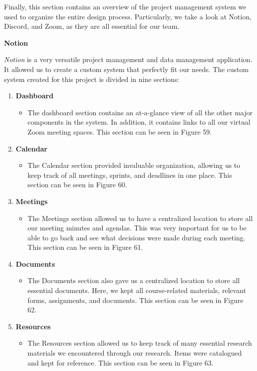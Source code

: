 \documentclass[titlepage, 12pt]{article}
\begin{document}
Finally, this section contains an overview of the project management system we used to organize the entire design process. Particularly, we take a look at Notion, Discord, and Zoom, as they are all essential for our team.

\textbf{Notion}

\emph{Notion} is a very versatile project management and data management application. It allowed us to create a custom system that perfectly fit our needs. The custom system created for this project is divided in nine sections:

\begin{enumerate}
    \item \textbf{Dashboard}
    \begin{itemize}
        \item The dashboard section contains an at-a-glance view of all the other major components in the system. In addition, it contains links to all our virtual Zoom meeting spaces. This section can be seen in Figure 59.
    \end{itemize}
    \item \textbf{Calendar}
    \begin{itemize}
        \item The Calendar section provided invaluable organization, allowing us to keep track of all meetings, sprints, and deadlines in one place. This section can be seen in Figure 60. 
    \end{itemize}
    \item \textbf{Meetings}
    \begin{itemize}
        \item The Meetings section allowed us to have a centralized location to store all our meeting minutes and agendas. This was very important for us to be able to go back and see what decisions were made during each meeting. This section can be seen in Figure 61. 
    \end{itemize}
    \item \textbf{Documents}
    \begin{itemize}
        \item The Documents section also gave us a centralized location to store all essential documents. Here, we kept all course-related materials, relevant forms, assignments, and documents. This section can be seen in Figure 62.
    \end{itemize}
    \item \textbf{Resources}
    \begin{itemize}
        \item The Resources section allowed us to keep track of many essential research materials we encountered through our research. Items were catalogued and kept for reference. This section can be seen in Figure 63.

\end{itemize}
\end{enumerate}
\end{document}
